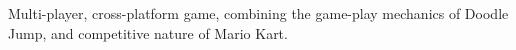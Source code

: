 \documentclass[letterpaper]{deedy-resume} %
\begin{document}
\begin{minipage}[t]{0.66\textwidth}
\sectionspace %



Multi-player, cross-platform game, combining the game-play mechanics of Doodle Jump, and competitive nature of Mario Kart.

\sectionspace %

\end{minipage} %

\end{document}
